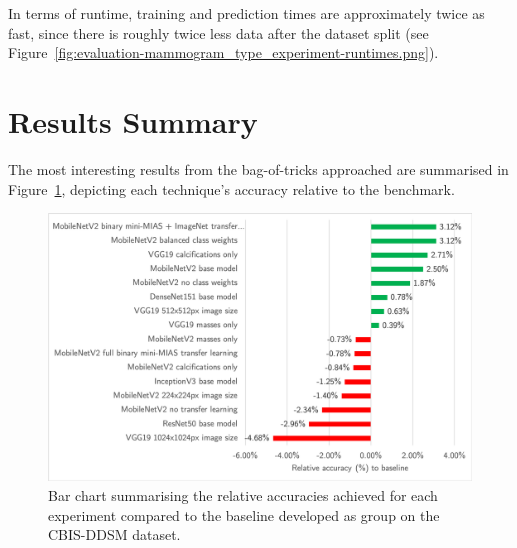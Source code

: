In terms of runtime, training and prediction times are approximately twice as fast, since there is roughly twice less data after the dataset split (see Figure~\ref{fig:evaluation-mammogram_type_experiment-runtimes.png}).


\section{Results Summary}

The most interesting results from the bag-of-tricks approached are summarised in Figure~\ref{fig:evaluation-result_comparison}, depicting each technique's accuracy relative to the benchmark. 

\begin{figure}[h]
\centerline{\includegraphics[width=\textwidth]{figures/evaluation/result_comparison.png}}
\caption{\label{fig:evaluation-result_comparison}Bar chart summarising the relative accuracies achieved for each experiment compared to the baseline developed as group on the CBIS-DDSM dataset.}
\end{figure}
